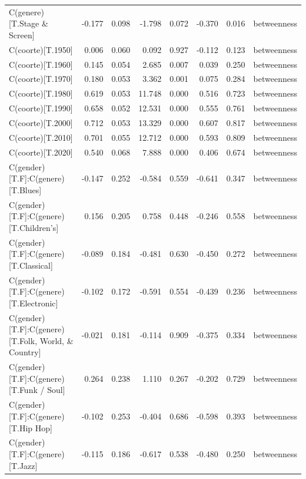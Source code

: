 \begin{table}
\begin{tabular}{lrrrrrrl}
                       C(genere)[T.Stage \& Screen] & -0.177 & 0.098 &  -1.798 & 0.072 & -0.370 &  0.016 & betweenness \\
                                 C(coorte)[T.1950] &  0.006 & 0.060 &   0.092 & 0.927 & -0.112 &  0.123 & betweenness \\
                                 C(coorte)[T.1960] &  0.145 & 0.054 &   2.685 & 0.007 &  0.039 &  0.250 & betweenness \\
                                 C(coorte)[T.1970] &  0.180 & 0.053 &   3.362 & 0.001 &  0.075 &  0.284 & betweenness \\
                                 C(coorte)[T.1980] &  0.619 & 0.053 &  11.748 & 0.000 &  0.516 &  0.723 & betweenness \\
                                 C(coorte)[T.1990] &  0.658 & 0.052 &  12.531 & 0.000 &  0.555 &  0.761 & betweenness \\
                                 C(coorte)[T.2000] &  0.712 & 0.053 &  13.329 & 0.000 &  0.607 &  0.817 & betweenness \\
                                 C(coorte)[T.2010] &  0.701 & 0.055 &  12.712 & 0.000 &  0.593 &  0.809 & betweenness \\
                                 C(coorte)[T.2020] &  0.540 & 0.068 &   7.888 & 0.000 &  0.406 &  0.674 & betweenness \\
                 C(gender)[T.F]:C(genere)[T.Blues] & -0.147 & 0.252 &  -0.584 & 0.559 & -0.641 &  0.347 & betweenness \\
            C(gender)[T.F]:C(genere)[T.Children's] &  0.156 & 0.205 &   0.758 & 0.448 & -0.246 &  0.558 & betweenness \\
             C(gender)[T.F]:C(genere)[T.Classical] & -0.089 & 0.184 &  -0.481 & 0.630 & -0.450 &  0.272 & betweenness \\
            C(gender)[T.F]:C(genere)[T.Electronic] & -0.102 & 0.172 &  -0.591 & 0.554 & -0.439 &  0.236 & betweenness \\
C(gender)[T.F]:C(genere)[T.Folk, World, \& Country] & -0.021 & 0.181 &  -0.114 & 0.909 & -0.375 &  0.334 & betweenness \\
           C(gender)[T.F]:C(genere)[T.Funk / Soul] &  0.264 & 0.238 &   1.110 & 0.267 & -0.202 &  0.729 & betweenness \\
               C(gender)[T.F]:C(genere)[T.Hip Hop] & -0.102 & 0.253 &  -0.404 & 0.686 & -0.598 &  0.393 & betweenness \\
                  C(gender)[T.F]:C(genere)[T.Jazz] & -0.115 & 0.186 &  -0.617 & 0.538 & -0.480 &  0.250 & betweenness \\

\end{tabular}
\end{table}
